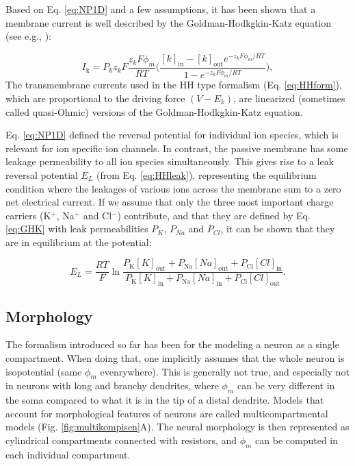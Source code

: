 Based on Eq. \ref{eq:NP1D} and a few assumptions, it has been shown that a membrane current is well described by the Goldman-Hodkgkin-Katz equation (see e.g., \cite{johnston1994foundations}):

\begin{equation}
I_\text{k} = P_k z_k F \frac{z_k F \phi_m}{R T} \Big( \frac{[k]_\text{in}-[k]_\text{out} e^{-z_k F \phi_m/RT}} {1-e^{-z_k F \phi_m/RT}} \Big), 
\label{eq:GHK}
\end{equation}
The transmembrane currents used in the HH type formalism (Eq. \ref{eq:HHform}), which are proportional to the driving force $(V-E_k)$, are linearized (sometimes called quasi-Ohmic) versions of the Goldman-Hodkgkin-Katz equation.

Eq. \ref{eq:NP1D} defined the reversal potential for individual ion species, which is relevant for ion specific ion channels. In contrast, the passive membrane has some leakage permeability to all ion species simultaneously. This gives rise to a leak reversal potential $E_L$ (from Eq. \ref{eq:HHleak}), representing the equilibrium condition where the leakages of various ions across the membrane sum to a zero net electrical current. If we assume that only the three most important charge carriers (K$^{+}$, Na$^{+}$ and Cl$^{-}$) contribute, and that they are defined by Eq. \ref{eq:GHK} with leak permeabilities $P_K$, $P_{Na}$ and $P_{Cl}$, it can be shown that they are in equilibrium at the potential:

\begin{equation}
E_L = \frac{R T}{F} 
\ln \frac{P_\text{K} [K]_\text{out}+P_\text{Na} [Na]_\text{out} + P_\text{Cl} [Cl]_\text{in}}
           {P_\text{K} [K]_\text{in}+P_\text{Na} [Na]_\text{in} + P_\text{Cl} [Cl]_\text{out}}.
\end{equation}


\subsection{Morphology}
The formalism introduced so far has been for the modeling a neuron as a single compartment. When doing that, one implicitly assumes that the whole neuron is isopotential (same $\phi_m$ evenrywhere). This is generally not true, and especially not in neurons with long and branchy dendrites, where $\phi_m$ can be very different in the soma compared to what it is in the tip of a distal dendrite. Models that account for morphological features of neurons are called multicompartmental models (Fig. \ref{fig:multikompisen}A). The neural morphology is then represented as cylindrical compartments connected with resistors, and $\phi_m$ can be computed in each individual compartment. 

